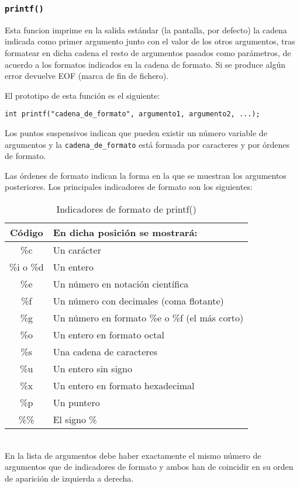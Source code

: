 \subsubsection{\texttt{printf()}}{
Esta funcion imprime en la salida estándar (la pantalla, por defecto) la cadena indicada como primer argumento junto con el valor de los otros argumentos, tras formatear en dicha cadena el resto de argumentos pasados como parámetros, de acuerdo a los formatos indicados en la cadena de formato. Si se produce algún error devuelve EOF (marca de fin de fichero).

El prototipo de esta función es el siguiente:

\texttt{int printf("cadena\_de\_formato", argumento1, argumento2, ...);}

Los puntos suspensivos indican que pueden existir un número variable de argumentos y la \texttt{cadena\_de\_formato} está formada por caracteres y por órdenes de formato.

Las órdenes de formato indican la forma en la que se muestran los argumentos posteriores. Los principales indicadores de formato son los siguientes:
\begin{table}[htbp]
	\begin{center}
		\begin{tabular}{|c|l|}
			\hline
			\textbf{Código} & \textbf{En dicha posición se mostrará:}  \\
			\hline 
			\%c  & Un carácter\\ \hline
			\%i o \%d  & Un entero\\ \hline
			\%e  & Un número en notación científica\\ \hline
			\%f  & Un número con decimales (coma flotante)\\ \hline
			\%g  & Un número en formato \%e o \%f (el más corto)\\ \hline
			\%o  & Un entero en formato octal\\ \hline	
			\%s  & Una cadena de caracteres\\ \hline
			\%u  & Un entero sin signo\\ \hline
			\%x  & Un entero en formato hexadecimal\\ \hline
			\%p  & Un puntero\\ \hline
			\%\%  & El signo \%\\ \hline
		\end{tabular}
		\caption{Indicadores de formato de printf()}
		\label{tabla:Indicadores de formato de printf()}
	\end{center}
\end{table}\\
En la lista de argumentos debe haber exactamente el mismo número de argumentos que de indicadores de formato y ambos han de coincidir en su orden de aparición de izquierda a derecha.
}

